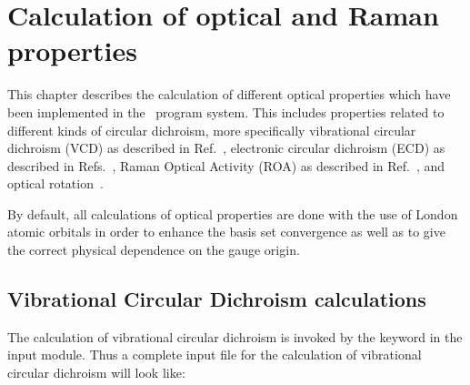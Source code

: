 \chapter{Calculation of optical and Raman properties}\label{ch:optchap}

This chapter describes the calculation of different optical
properties which have been implemented in the \siraba\ program system.
This includes properties related to different kinds of circular
dichroism, more specifically vibrational circular dichroism
(VCD) as 
described in Ref.~\cite{klbpjthkrhjajjcp98}, electronic circular
dichroism (ECD) as
described in Refs.~\cite{klbaehkrthjopjtca90,tbpaehcpl246}, Raman 
Optical Activity (ROA) as
described in Ref.~\cite{thkrklbpjjofd99}, and optical rotation~\cite{plpmp91,plpdkckrcpl319}.

By default, all calculations of optical properties are done with
the use of London atomic orbitals in order to
enhance the basis set 
convergence as well as to give the correct physical dependence on the
gauge origin. 

\section{Vibrational Circular Dichroism calculations}

\begin{center}
\end{center}

The calculation of vibrational circular
dichroism is invoked
by the 
keyword  in the  input module. Thus a complete
input file for the calculation of vibrational circular dichroism will
look like:

